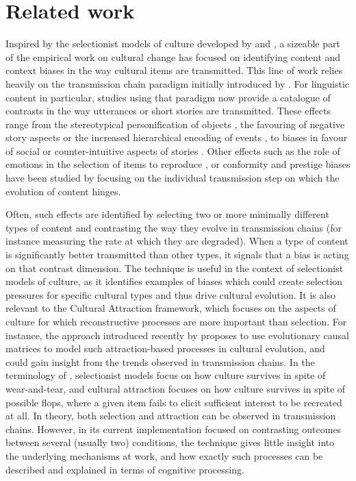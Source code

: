 \section{Related work}\label{sec:gistr-related}

Inspired by the selectionist models of culture developed by
\textcite{boyd_culture_1985} and
\textcite{cavalli-sforza_cultural_1981}, a sizeable part of the
empirical work on cultural change has focused on identifying content and
context biases in the way cultural items are transmitted. This line of
work relies heavily on the transmission chain paradigm initially
introduced by \textcite{bartlett_remembering:_1995}. For linguistic
content in particular, studies using that paradigm now provide a
catalogue of contrasts in the way utterances or short stories are
transmitted. These effects range from the stereotypical personification
of objects \autocite{bangerter_transformation_2000}, the favouring of
negative story aspects \autocite{bebbington_sky_2017} or the increased
hierarchical encoding of events \autocite{mesoudi_hierarchical_2004}, to
biases in favour of social \autocite{mesoudi_bias_2006} or
counter-intuitive aspects of stories
\autocites{norenzayan_memory_2006}{barrett_spreading_2001}. Other
effects such as the role of emotions in the selection of items to
reproduce \autocites{heath_emotional_2001}{eriksson_corpses_2014}, or
conformity and prestige biases \autocite{acerbi_did_2017} have been
studied by focusing on the individual transmission step on which the
evolution of content hinges.

Often, such effects are identified by selecting two or more minimally
different types of content and contrasting the way they evolve in
transmission chains (for instance measuring the rate at which they are
degraded). When a type of content is significantly better transmitted
than other types, it signals that a bias is acting on that contrast
dimension. The technique is useful in the context of selectionist models
of culture, as it identifies examples of biases which could create
selection pressures for specific cultural types and thus drive cultural
evolution. It is also relevant to the Cultural Attraction framework,
which focuses on the aspects of culture for which reconstructive
processes are more important than selection. For instance, the approach
introduced recently by \textcite{claidiere_how_2014} proposes to
use evolutionary causal matrices to model such attraction-based
processes in cultural evolution, and could gain insight from the trends
observed in transmission chains. In the terminology of
\textcite{morin_how_2016}, selectionist models focus on how culture
survives in spite of wear-and-tear, and cultural attraction focuses on
how culture survives in spite of possible flops, where a given item
fails to elicit sufficient interest to be recreated at all. In theory,
both selection and attraction can be observed in transmission chains. However, in
its current implementation focused on contrasting outcomes between
several (usually two) conditions, the technique gives little insight
into the underlying mechanisms at work, and how exactly such processes
can be described and explained in terms of cognitive %
processing.

